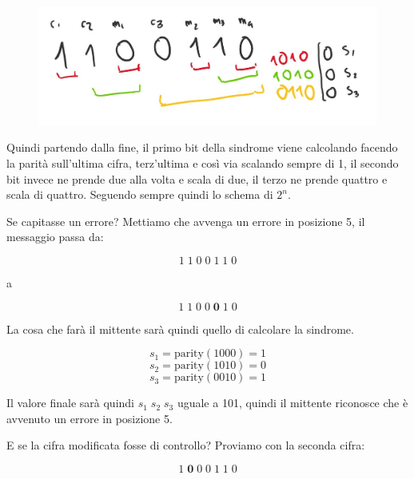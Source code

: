 \begin{figure}[h]
	\centering
	\includegraphics[width=0.7\linewidth]{immagini/img6}
\end{figure}

Quindi partendo dalla fine, il primo bit della sindrome viene calcolando facendo la parità sull'ultima cifra, terz'ultima e così via scalando sempre di 1, il secondo bit invece ne prende due alla volta e scala di due, il terzo ne prende quattro e scala di quattro. Seguendo sempre quindi lo schema di $2^n$.

\newpage

Se capitasse un errore?
Mettiamo che avvenga un errore in posizione 5, il messaggio passa da:

\begin{equation*}
1 \; 1 \; 0 \; 0 \; 1 \; 1 \; 0
\end{equation*}

a

\begin{equation*}
1 \; 1 \; 0 \; 0 \; \textbf{0} \; 1 \; 0
\end{equation*}

La cosa che farà il mittente sarà quindi quello di calcolare la sindrome.

\begin{equation*}
s_1 = \text{parity}(1000) = 1
\end{equation*}
\begin{equation*}
s_2 = \text{parity}(1010) = 0
\end{equation*}
\begin{equation*}
s_3 = \text{parity}(0010) = 1
\end{equation*}

Il valore finale sarà quindi $s_1 \; s_2 \; s_3$ uguale a 101, quindi il mittente riconosce che è avvenuto un errore in posizione 5.

E se la cifra modificata fosse di controllo? Proviamo con la seconda cifra:

\begin{equation*}
1 \; \textbf{0} \; 0 \; 0 \; 1 \; 1 \; 0
\end{equation*}

